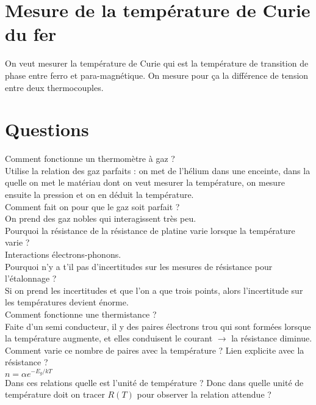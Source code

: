 \documentclass[12pt,prb,aps,epsf]{report}
\begin{document}
\section{Mesure de la température de Curie du fer}
On veut mesurer la température de Curie qui est la température de transition de phase entre ferro et para-magnétique. On mesure pour ça la différence de tension entre deux thermocouples.


\section*{Questions}
Comment fonctionne un thermomètre à gaz ?\\
Utilise la relation des gaz parfaits : on met de l'hélium dans une enceinte, dans la quelle on met le matériau dont on veut mesurer la température, on mesure ensuite la pression et on en déduit la température.\\

Comment fait on pour que le gaz soit parfait ?\\
On prend des gaz nobles qui interagissent très peu.\\

Pourquoi la résistance de la résistance de platine varie lorsque la température varie ?\\
Interactions électrons-phonons.\\

Pourquoi n'y a t'il pas d'incertitudes sur les mesures de résistance pour l'étalonnage ?\\
Si on prend les incertitudes et que l'on a que trois points, alors l'incertitude sur les températures devient énorme.\\

Comment fonctionne une thermistance ?\\
Faite d'un semi conducteur, il y des paires électrons trou qui sont formées lorsque la température augmente, et elles conduisent le courant $\rightarrow$ la résistance diminue.\\

Comment varie ce nombre de paires avec la température ? Lien explicite avec la résistance ?\\
$n = \alpha e^{-E_g/kT}$\\

Dans ces relations quelle est l'unité de température ? Donc dans quelle unité de température doit on tracer $R(T)$ pour observer la relation attendue ?\\
\end{document}
